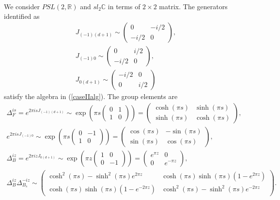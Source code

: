 \documentclass[a4paper,11pt]{article}
\theoremstyle{definition}
\begin{document}
We consider $PSL(2,\mathbb{R})$ and $sl_2\mathbb{C}$ in terms of $2\times2$ matrix. The generators identified as
\begin{gather}
   J_{(-1)(d+1)} \sim \begin{pmatrix} 0 & -i/2 \\-i/2 & 0\end{pmatrix},\\
    J_{(-1)0} \sim \begin{pmatrix} 0 & i/2 \\-i/2 & 0\end{pmatrix},\\
    J_{0(d+1)}  \sim \begin{pmatrix}-i/2 & 0 \\ 0 & i/2\end{pmatrix}
\end{gather}
satisfy the algebra in (\ref{caseIIalg}). 
The group elements are
\begin{gather}
    \Delta_F^{is}=e^{2\pi i s J_{(-1)(d+1)}} \sim \exp (\pi s \begin{pmatrix}0 & 1 \\1 & 0\end{pmatrix}) = \begin{pmatrix}\cosh(\pi s) & \sinh(\pi s) \\ \sinh(\pi s) & \cosh(\pi s)\end{pmatrix},\\
      e^{2\pi i s J_{(-1)0}} \sim \exp (\pi s \begin{pmatrix}0 & -1 \\1 & 0\end{pmatrix}) = \begin{pmatrix}\cos(\pi s) & -\sin(\pi s) \\ \sin(\pi s) & \cos(\pi s)\end{pmatrix},\\
    \Delta_B^{iz}= e^{2\pi iz J_{0(d+1)}} \sim \exp (\pi z \begin{pmatrix}1 & 0 \\ 0 & -1\end{pmatrix}) = \begin{pmatrix} e^{\pi z} & 0 \\ 0 & e^{-\pi z}\end{pmatrix},\\
    \Delta_{B}^{iz}\Delta_{B_s}^{-iz} \sim \begin{pmatrix} \cosh^2(\pi s) - \sinh^2(\pi s) e^{2\pi z} & \cosh(\pi s)\sinh(\pi s) (1-e^{2\pi z}) \\\cosh(\pi s)\sinh(\pi s) (1-e^{-2\pi z}) & \cosh^2(\pi s) - \sinh^2(\pi s) e^{-2\pi z}\end{pmatrix}.
\end{gather}
\end{document}
